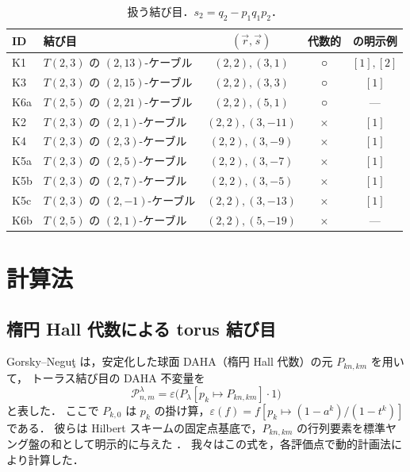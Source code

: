 \documentclass[11pt,a4paper]{ltjsarticle}
\theoremstyle{definition}
\theoremstyle{remark}
\begin{document}
\begin{table}[h]
\centering
\caption{扱う結び目．$s_2=q_2-p_1q_1p_2$．}\label{tab:knots}
\begin{tabular}{llccc}
\toprule
ID & 結び目 & $(\vec r,\vec s)$ & 代数的 & \cite{CD14} の明示例 \\
\midrule
K1 & $T(2,3)$ の $(2,13)$-ケーブル & $(2,2),(3,1)$ & ○ & $[1],[2]$ \\
K3 & $T(2,3)$ の $(2,15)$-ケーブル & $(2,2),(3,3)$ & ○ & $[1]$ \\
K6a & $T(2,5)$ の $(2,21)$-ケーブル & $(2,2),(5,1)$ & ○ & --- \\
K2 & $T(2,3)$ の $(2,1)$-ケーブル & $(2,2),(3,-11)$ & × & $[1]$ \\
K4 & $T(2,3)$ の $(2,3)$-ケーブル & $(2,2),(3,-9)$ & × & $[1]$ \\
K5a & $T(2,3)$ の $(2,5)$-ケーブル & $(2,2),(3,-7)$ & × & $[1]$ \\
K5b & $T(2,3)$ の $(2,7)$-ケーブル & $(2,2),(3,-5)$ & × & $[1]$ \\
K5c & $T(2,3)$ の $(2,-1)$-ケーブル & $(2,2),(3,-13)$ & × & $[1]$ \\
K6b & $T(2,5)$ の $(2,1)$-ケーブル & $(2,2),(5,-19)$ & × & --- \\
\bottomrule
\end{tabular}
\end{table}

\section{計算法}\label{sec:method}

\subsection{楕円 Hall 代数による torus 結び目}

Gorsky--Neguţ \cite{GN} は，安定化した球面 DAHA（楕円 Hall 代数）の元 $P_{kn,km}$ を用いて，
トーラス結び目の DAHA 不変量を
\begin{equation}\label{eq:GN}
\mathcal{P}^\lambda_{n,m}=\varepsilon\big(P_\lambda[p_k\mapsto P_{kn,km}]\cdot1\big)
\end{equation}
と表した．
ここで $P_{k,0}$ は $p_k$ の掛け算，$\varepsilon(f)=f[p_k\mapsto(1-a^k)/(1-t^k)]$ である．
彼らは Hilbert スキームの固定点基底で，$P_{kn,km}$ の行列要素を標準ヤング盤の和として明示的に与えた \cite[\S4]{GN}．
我々はこの式を，各評価点で動的計画法により計算した．
\end{document}
